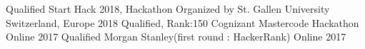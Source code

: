 \begin{cvhonors}
  \cvhonor
    {Qualified}
    {Start Hack 2018, Hackathon Organized by St. Gallen University}
    {Switzerland, Europe}
    {2018}
  \cvhonor
    {Qualified, Rank:150} 
    {Cognizant Mastercode Hackathon}
    {Online}
    {2017}
   \cvhonor
    {Qualified}
    {Morgan Stanley(first round : HackerRank)}
    {Online}
    {2017}
\end{cvhonors}

